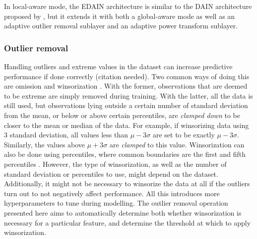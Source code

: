 \documentclass{statsmsc}
\begin{document}
In local-aware mode, the \ac{EDAIN} architecture is similar to the
\ac{DAIN} architecture proposed by \citeauthor{dain}, but it
extends it with both a global-aware mode as well as an adaptive outlier removal sublayer and
an adaptive power transform sublayer.

\subsubsection{Outlier removal}%
\label{ssub:Outlier removal}

Handling outliers and extreme values in the dataset can increase predictive performance if done
correctly (citation needed). Two common ways of doing this are omission and winsorization
\citep{winsorization}. With the former, observations that are deemed to be extreme are simply
removed during training. With the latter, all the data is still used, but observations lying
outside a certain number of standard deviation from the mean, or below or above certain
percentiles, are \textit{clamped down} to be closer to the mean or median of the data.
For example, if winsorizing data using 3 standard deviation, all values less than
$\mu-3\sigma$ are set to be exactly $\mu-3\sigma$. Similarly, the values above
$\mu+3\sigma$ are \textit{clamped} to this value. Winsorization can also be done using percentiles,
where common boundaries are the first and fifth percentiles \citep{winsorization}.
However, the type of winsorization, as well as the number of standard deviation
or percentiles to use, might depend on the dataset. Additionally, it might not
be necessary to winsorize the data at all if the outliers turn out to not
negatively affect performance. All this introduces more hyperparameters to tune
during modelling. The outlier removal operation presented here aims to automatically  determine both
whether winsorization is necessary for a particular feature, and determine the threshold at
which to apply winsorization.
\end{document}
